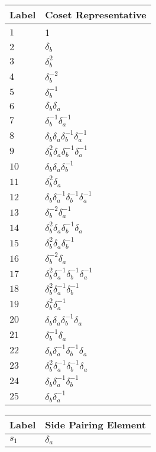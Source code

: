 \documentclass{article}
\begin{document}

\begin{center}
\begin{tabular}{ll}
\toprule
Label & Coset Representative\\
\midrule
$1$ & 1 \\
$2$ & $\delta_b^{}$ \\
$3$ & $\delta_b^{2}$ \\
$4$ & $\delta_b^{-2}$ \\
$5$ & $\delta_b^{-1}$ \\
$6$ & $\delta_b^{}\delta_a^{}$ \\
$7$ & $\delta_b^{-1}\delta_a^{-1}$ \\
$8$ & $\delta_b^{}\delta_a^{}\delta_b^{-1}\delta_a^{-1}$ \\
$9$ & $\delta_b^{2}\delta_a^{}\delta_b^{-1}\delta_a^{-1}$ \\
$10$ & $\delta_b^{}\delta_a^{}\delta_b^{-1}$ \\
$11$ & $\delta_b^{2}\delta_a^{}$ \\
$12$ & $\delta_b^{}\delta_a^{-1}\delta_b^{-1}\delta_a^{-1}$ \\
$13$ & $\delta_b^{-2}\delta_a^{-1}$ \\
$14$ & $\delta_b^{2}\delta_a^{}\delta_b^{-1}\delta_a^{}$ \\
$15$ & $\delta_b^{2}\delta_a^{}\delta_b^{-1}$ \\
$16$ & $\delta_b^{-2}\delta_a^{}$ \\
$17$ & $\delta_b^{2}\delta_a^{-1}\delta_b^{-1}\delta_a^{-1}$ \\
$18$ & $\delta_b^{2}\delta_a^{-1}\delta_b^{-1}$ \\
$19$ & $\delta_b^{2}\delta_a^{-1}$ \\
$20$ & $\delta_b^{}\delta_a^{}\delta_b^{-1}\delta_a^{}$ \\
$21$ & $\delta_b^{-1}\delta_a^{}$ \\
$22$ & $\delta_b^{}\delta_a^{-1}\delta_b^{-1}\delta_a^{}$ \\
$23$ & $\delta_b^{2}\delta_a^{-1}\delta_b^{-1}\delta_a^{}$ \\
$24$ & $\delta_b^{}\delta_a^{-1}\delta_b^{-1}$ \\
$25$ & $\delta_b^{}\delta_a^{-1}$ \\
\bottomrule
\end{tabular}
\hfill
\begin{tabular}{ll}
\toprule
Label & Side Pairing Element\\
\midrule
$s_{1}$ & $\delta_a^{}$ \\

\end{tabular}
\end{center}
\end{document}
